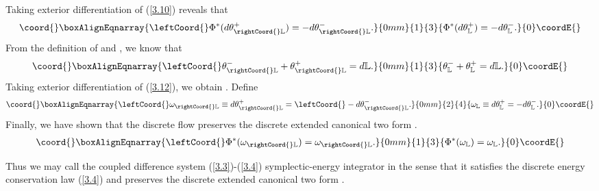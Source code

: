 \documentclass[a4paper,a4paper]{article}
\begin{document}
Taking exterior differentiation of (\ref{3.10}) reveals that
\begin{align}\coord{}\boxAlignEqnarray{
  \leftCoord{}\Phi^{*}(d\theta_{\rightCoord{}\mathbb{L}}^{+})=-d\theta_{\rightCoord{}\mathbb{L}}^{-}. \label{3.11}
}{0mm}{1}{3}{
  \Phi^{*}(d\theta_{\mathbb{L}}^{+})=-d\theta_{\mathbb{L}}^{-}. }{0}\coordE{}\end{align}
From the definition of \coordHE{} and
\coordHE{}, we know that
\begin{align}\coord{}\boxAlignEqnarray{
   \leftCoord{}\theta_{\rightCoord{}\mathbb{L}}^{-}+\theta_{\rightCoord{}\mathbb{L}}^{+}=d\mathbb{L}.\label{3.12}
}{0mm}{1}{3}{
   \theta_{\mathbb{L}}^{-}+\theta_{\mathbb{L}}^{+}=d\mathbb{L}.}{0}\coordE{}\end{align}
Taking exterior differentiation of (\ref{3.12}), we obtain
\coordHE{}.  Define
\begin{align}\coord{}\boxAlignEqnarray{
 \leftCoord{}\omega_{\rightCoord{}\mathbb{L}}\equiv d\theta_{\rightCoord{}\mathbb{L}}^{+}=
\leftCoord{}-d\theta_{\rightCoord{}\mathbb{L}}^{-}.\label{3.13}
}{0mm}{2}{4}{
 \omega_{\mathbb{L}}\equiv d\theta_{\mathbb{L}}^{+}=
-d\theta_{\mathbb{L}}^{-}.}{0}\coordE{}\end{align}
Finally, we have shown that the discrete flow \myHighlight{$\Phi$}\coordHE{} preserves the discrete
extended canonical two form \coordHE{}.
\begin{align}\coord{}\boxAlignEqnarray{
  \leftCoord{}\Phi^{*}(\omega_{\rightCoord{}\mathbb{L}})=\omega_{\rightCoord{}\mathbb{L}}. \label{3.14}
}{0mm}{1}{3}{
  \Phi^{*}(\omega_{\mathbb{L}})=\omega_{\mathbb{L}}. }{0}\coordE{}\end{align}

Thus we may call the coupled difference system
(\ref{3.3})-(\ref{3.4}) symplectic-energy integrator in the sense
that it satisfies the discrete energy conservation law (\ref{3.4})
and preserves the discrete extended canonical two form
\coordHE{}.
\end{document}

